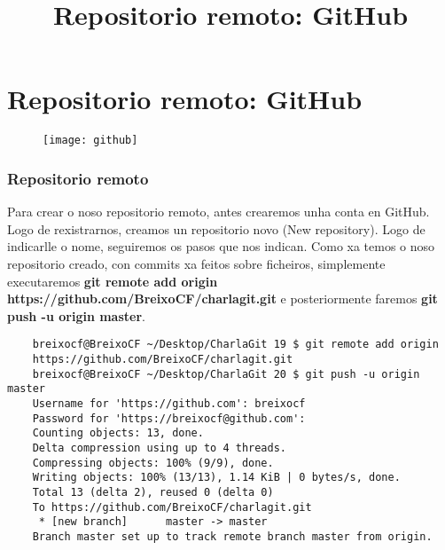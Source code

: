 \section{Repositorio remoto: GitHub}

\title[Git e GitHub]{Repositorio remoto: GitHub}
\author[Fran Rúa e Breixo Camiña]{}

\begin{frame}
  \titlepage
  \begin{figure}[H]
    \centering
    \label{fig:github}
    \texttt{[image: github]}
  \end{figure}
\end{frame}

\begin{frame}[fragile]
  \frametitle{Repositorio remoto}
  \scriptsize
  Para crear o noso repositorio remoto, antes crearemos unha conta en GitHub. Logo de rexistrarnos, creamos un repositorio novo (New repository). Logo de indicarlle o nome, seguiremos os pasos que nos indican. Como xa temos o noso repositorio creado, con commits xa feitos sobre ficheiros, simplemente executaremos \textbf{git remote add origin https://github.com/BreixoCF/charlagit.git} e posteriormente faremos \textbf{git push -u origin master}.
  \tiny
\begin{verbatim}
	breixocf@BreixoCF ~/Desktop/CharlaGit 19 $ git remote add origin 
	https://github.com/BreixoCF/charlagit.git
	breixocf@BreixoCF ~/Desktop/CharlaGit 20 $ git push -u origin master 
	Username for 'https://github.com': breixocf
	Password for 'https://breixocf@github.com': 
	Counting objects: 13, done.
	Delta compression using up to 4 threads.
	Compressing objects: 100% (9/9), done.
	Writing objects: 100% (13/13), 1.14 KiB | 0 bytes/s, done.
	Total 13 (delta 2), reused 0 (delta 0)
	To https://github.com/BreixoCF/charlagit.git
	 * [new branch]      master -> master
	Branch master set up to track remote branch master from origin.
\end{verbatim}	
\end{frame}

